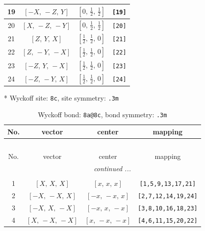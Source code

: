 \documentclass[fleqn,8pt]{jsarticle}
\begin{document}
\begin{longtable}{cccc}
19 & $\left[ - X,\, - Z,\, Y \right]$ & $\left[ 0,\, \frac{1}{2},\, \frac{1}{2} \right]$ & {\tt [19]} \\ \hline
20 & $\left[ X,\, - Z,\, - Y \right]$ & $\left[ 0,\, \frac{1}{2},\, \frac{1}{2} \right]$ & {\tt [20]} \\ \hline
21 & $\left[ Z,\, Y,\, X \right]$ & $\left[ \frac{1}{2},\, \frac{1}{2},\, 0 \right]$ & {\tt [21]} \\ \hline
22 & $\left[ Z,\, - Y,\, - X \right]$ & $\left[ \frac{1}{2},\, \frac{1}{2},\, 0 \right]$ & {\tt [22]} \\ \hline
23 & $\left[ - Z,\, Y,\, - X \right]$ & $\left[ \frac{1}{2},\, \frac{1}{2},\, 0 \right]$ & {\tt [23]} \\ \hline
24 & $\left[ - Z,\, - Y,\, X \right]$ & $\left[ \frac{1}{2},\, \frac{1}{2},\, 0 \right]$ & {\tt [24]} \\
\end{longtable}
* Wyckoff site: {\tt 8c}, site symmetry: {\tt .3m}
\renewcommand{\arraystretch}{1.2}
\begin{longtable}{cccc}
\caption{Wyckoff bond: {\tt 8a@8c}, bond symmetry: {\tt .3m}}
 \\
 \hline \hline
No. & vector & center & mapping \\ \hline \endfirsthead

\multicolumn{3}{l}{\tablename\ \thetable{}} \\
 \hline \hline
No. & vector & center & mapping \\ \hline \endhead

 \hline \hline
\multicolumn{3}{r}{\footnotesize\it continued ...} \\ \endfoot

 \hline \hline
\multicolumn{3}{r}{} \\ \endlastfoot

1 & $\left[ X,\, X,\, X \right]$ & $\left[ x,\, x,\, x \right]$ & {\tt [1,5,9,13,17,21]} \\ \hline
2 & $\left[ - X,\, - X,\, X \right]$ & $\left[ - x,\, - x,\, x \right]$ & {\tt [2,7,12,14,19,24]} \\ \hline
3 & $\left[ - X,\, X,\, - X \right]$ & $\left[ - x,\, x,\, - x \right]$ & {\tt [3,8,10,16,18,23]} \\ \hline
4 & $\left[ X,\, - X,\, - X \right]$ & $\left[ x,\, - x,\, - x \right]$ & {\tt [4,6,11,15,20,22]} \\
\end{longtable}
\renewcommand{\arraystretch}{1.2}
\end{document}
